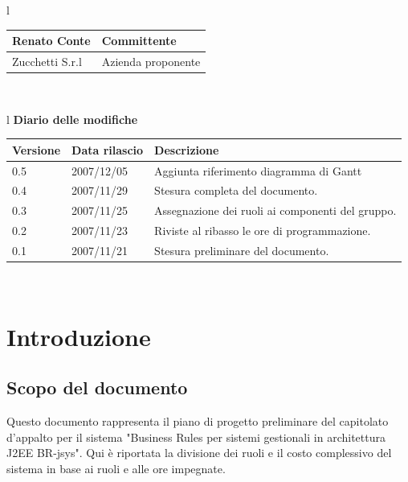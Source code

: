\documentclass[11pt,titlepage,a4paper]{report}
\begin{document}
\begin{center}
\begin{table}[hbtp]
{\begin{tabular}{l}
\begin{tabular}{||p{6cm}||p{6cm}||}
{Renato Conte}& Committente \\
\hline 
{Zucchetti S.r.l}& Azienda proponente\\
\hline
\hline
\end{tabular} \\
\end{tabular}
}
\end{table}
\begin{table}[hbtp]
\large{
\begin{tabular}{l}
\Large{\textbf{\textsf{Diario delle modifiche}}} \\
\begin{tabular}{||p{2cm}||p{3.5cm}||p{6cm}||}
\hline
\textbf{Versione} & \textbf{Data rilascio} & \textbf{Descrizione} \\
\hline
0.5 & 2007/12/05 & Aggiunta riferimento diagramma di Gantt \\
\hline
0.4 & 2007/11/29 & Stesura completa del documento. \\
\hline
0.3 & 2007/11/25 & Assegnazione dei ruoli ai componenti del gruppo. \\
\hline
0.2 & 2007/11/23 & Riviste al ribasso le ore di programmazione. \\
\hline
0.1 & 2007/11/21 & Stesura preliminare del documento. \\
\hline

\end{tabular} \\
\end{tabular}

}
\end{table}
\end{center}


\tableofcontents %

\chapter{Introduzione}
\section{Scopo del documento}
Questo documento rappresenta il piano di progetto preliminare
del capitolato d'appalto per il sistema "Business Rules per sistemi
gestionali in architettura J2EE BR-jsys". 
Qui \`e riportata la divisione dei ruoli e il costo complessivo del
sistema in base ai ruoli e alle ore impegnate.
\end{document}
